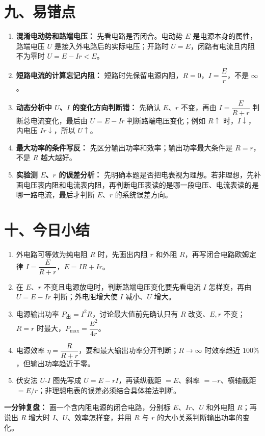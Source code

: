 \section*{九、易错点}

\begin{mistakebox}
\begin{enumerate}
  \item \textbf{混淆电动势和路端电压：} 先看电路是否闭合。电动势 $E$ 是电源本身的属性，路端电压 $U$ 是接入外电路后的实际电压；开路时 $U = E$，闭路有电流且内阻不为零时 $U = E-Ir < E$。

  \item \textbf{短路电流的计算忘记内阻：} 短路时先保留电源内阻，$R = 0$，$I = \dfrac{E}{r}$，不是 $\infty$。

  \item \textbf{动态分析中 $U$、$I$ 的变化方向判断错：} 先确认 $E$、$r$ 不变，再由 $I=\dfrac{E}{R+r}$ 判断总电流变化，最后由 $U=E-Ir$ 判断路端电压变化；例如 $R\uparrow$ 时，$I\downarrow$，内电压 $Ir\downarrow$，所以 $U\uparrow$。

  \item \textbf{最大功率的条件写反：} 先区分输出功率和效率；输出功率最大条件是 $R = r$，不是 $R$ 越大越好。

  \item \textbf{实验测 $E$、$r$ 的误差分析：} 先明确本题是否把电表视为理想。若非理想，先补画电压表内阻和电流表内阻，再判断电压表读的是哪一段电压、电流表读的是哪一路电流，最后才判断 $E$、$r$ 的系统误差方向。
\end{enumerate}
\end{mistakebox}

\section*{十、今日小结}

\begin{enumerate}
  \item 外电路可等效为纯电阻 $R$ 时，先画出内阻 $r$ 和外阻 $R$，再写闭合电路欧姆定律 $I = \dfrac{E}{R+r}$，$E = IR + Ir$。
  \item 在 $E$、$r$ 不变且电源放电时，判断路端电压变化要先看电流 $I$ 怎样变，再由 $U = E - Ir$ 判断；外电阻增大使 $I$ 减小、$U$ 增大。
  \item 电源输出功率 $P_{\text{出}} = I^2R$，讨论最大值前先确认只有 $R$ 改变、$E,r$ 不变；$R = r$ 时最大，$P_{\max} = \dfrac{E^2}{4r}$。
  \item 电源效率 $\eta = \dfrac{R}{R+r}$，要和最大输出功率分开判断；$R\to\infty$ 时效率趋近 $100\%$，但输出功率趋近于零。
  \item 伏安法 $U$-$I$ 图先写成 $U=E-rI$，再读纵截距 $=E$、斜率 $=-r$、横轴截距 $=E/r$；非理想电表的误差必须结合具体接法判断。
\end{enumerate}

\textbf{一分钟复盘：} 画一个含内阻电源的闭合电路，分别标 $E$、$Ir$、$U$ 和外电阻 $R$；再说出 $R$ 增大时 $I$、$U$、效率怎样变，并用 $R$ 与 $r$ 的大小关系判断输出功率的变化。
